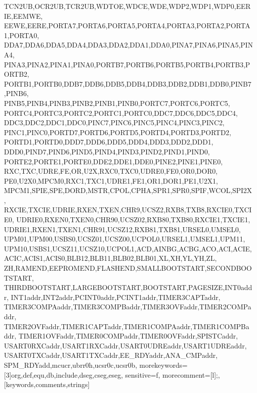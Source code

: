 {{                TCN2UB,OCR2UB,TCR2UB,WDTOE,WDCE,WDE,WDP2,WDP1,WDP0,EERIE,EEMWE,
                EEWE,EERE,PORTA7,PORTA6,PORTA5,PORTA4,PORTA3,PORTA2,PORTA1,PORTA0,
                DDA7,DDA6,DDA5,DDA4,DDA3,DDA2,DDA1,DDA0,PINA7,PINA6,PINA5,PINA4,
                PINA3,PINA2,PINA1,PINA0,PORTB7,PORTB6,PORTB5,PORTB4,PORTB3,PORTB2,
                PORTB1,PORTB0,DDB7,DDB6,DDB5,DDB4,DDB3,DDB2,DDB1,DDB0,PINB7,PINB6,
                PINB5,PINB4,PINB3,PINB2,PINB1,PINB0,PORTC7,PORTC6,PORTC5,
                PORTC4,PORTC3,PORTC2,PORTC1,PORTC0,DDC7,DDC6,DDC5,DDC4,
                DDC3,DDC2,DDC1,DDC0,PINC7,PINC6,PINC5,PINC4,PINC3,PINC2,
                PINC1,PINC0,PORTD7,PORTD6,PORTD5,PORTD4,PORTD3,PORTD2,
                PORTD1,PORTD0,DDD7,DDD6,DDD5,DDD4,DDD3,DDD2,DDD1,
                DDD0,PIND7,PIND6,PIND5,PIND4,PIND3,PIND2,PIND1,PIND0,
                PORTE2,PORTE1,PORTE0,DDE2,DDE1,DDE0,PINE2,PINE1,PINE0,
                RXC,TXC,UDRE,FE,OR,U2X,RXC0,TXC0,UDRE0,FE0,OR0,DOR0,
                PE0,U2X0,MPCM0,RXC1,TXC1,UDRE1,FE1,OR1,DOR1,PE1,U2X1,
                MPCM1,SPIE,SPE,DORD,MSTR,CPOL,CPHA,SPR1,SPR0,SPIF,WCOL,SPI2X,
                RXCIE,TXCIE,UDRIE,RXEN,TXEN,CHR9,UCSZ2,RXB8,TXB8,RXCIE0,TXCIE0,
                UDRIE0,RXEN0,TXEN0,CHR90,UCSZ02,RXB80,TXB80,RXCIE1,TXCIE1,
                UDRIE1,RXEN1,TXEN1,CHR91,UCSZ12,RXB81,TXB81,URSEL0,UMSEL0,
                UPM01,UPM00,USBS0,UCSZ01,UCSZ00,UCPOL0,URSEL1,UMSEL1,UPM11,
                UPM10,USBS1,UCSZ11,UCSZ10,UCPOL1,ACD,AINBG,ACBG,ACO,ACI,ACIE,
                ACIC,ACIS1,ACIS0,BLB12,BLB11,BLB02,BLB01,XL,XH,YL,YH,ZL,
                ZH,RAMEND,EEPROMEND,FLASHEND,SMALLBOOTSTART,SECONDBOOTSTART,
                THIRDBOOTSTART,LARGEBOOTSTART,BOOTSTART,PAGESIZE,INT0addr,
                INT1addr,INT2addr,PCINT0addr,PCINT1addr,TIMER3CAPTaddr,
                TIMER3COMPAaddr,TIMER3COMPBaddr,TIMER3OVFaddr,TIMER2COMPaddr,
                TIMER2OVFaddr,TIMER1CAPTaddr,TIMER1COMPAaddr,TIMER1COMPBaddr,
                TIMER1OVFaddr,TIMER0COMPaddr,TIMER0OVFaddr,SPISTCaddr,
                USART0RXCaddr,USART1RXCaddr,USART0UDREaddr,USART1UDREaddr,
                USART0TXCaddr,USART1TXCaddr,EE_RDYaddr,ANA_CMPaddr,
                SPM_RDYadd,mcucr,ubrr0h,ucsr0c,ucsr0b},%
morekeywords=[3]{org,def,equ,db,include,dseg,cseg,eseg},%
sensitive=f,%
morecomment=[l];,%
}[keywords,comments,strings]%
